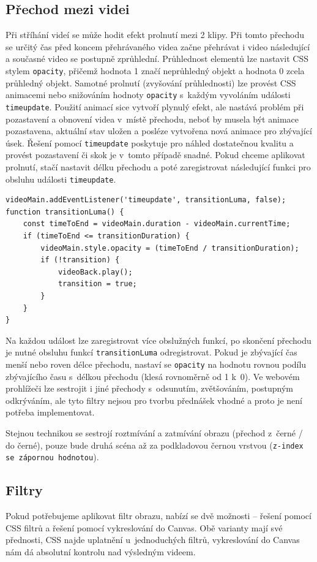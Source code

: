 \subsection{Přechod mezi videi}
Při stříhání videí se může hodit efekt prolnutí mezi 2 klipy. Při tomto přechodu se určitý čas před koncem přehrávaného videa začne přehrávat i video následující a současné video se postupně zprůhlední. Průhlednost elementů lze nastavit CSS stylem \texttt{opacity}, přičemž hodnota 1 značí neprůhledný objekt a hodnota 0 zcela průhledný objekt. Samotné prolnutí (zvyšování průhlednosti) lze provést CSS animacemi nebo snižováním hodnoty \texttt{opacity} s~každým vyvoláním události \texttt{timeupdate}. Použití animací sice vytvoří plynulý efekt, ale nastává problém při pozastavení a obnovení videa v~místě přechodu, neboť by musela být animace pozastavena, aktuální stav uložen a posléze vytvořena nová animace pro zbývající úsek. Řešení pomocí \texttt{timeupdate} poskytuje pro náhled dostatečnou kvalitu a provést pozastavení či skok je v~tomto případě snadné. Pokud chceme aplikovat prolnutí, stačí nastavit délku přechodu a poté zaregistrovat následující funkci pro obsluhu události \texttt{timeupdate}.
\begin{lstlisting}[style=JavaScript]
videoMain.addEventListener('timeupdate', transitionLuma, false);
function transitionLuma() {
    const timeToEnd = videoMain.duration - videoMain.currentTime;
    if (timeToEnd <= transitionDuration) {
        videoMain.style.opacity = (timeToEnd / transitionDuration);
        if (!transition) {
            videoBack.play();
            transition = true;
        }
    }
}
\end{lstlisting}
Na každou událost lze zaregistrovat více obslužných funkcí, po skončení přechodu je nutné obsluhu funkcí \texttt{transitionLuma} odregistrovat. Pokud je zbývající čas menší nebo roven délce přechodu, nastaví se \texttt{opacity} na hodnotu rovnou podílu zbývajícího času s~délkou přechodu (klesá rovnoměrně od 1 k~0). Ve webovém prohlížeči lze sestrojit i jiné přechody s~odsunutím, zvětšováním, postupným odkrýváním, ale tyto filtry nejsou pro tvorbu přednášek vhodné a proto je není potřeba implementovat.

Stejnou technikou se sestrojí roztmívání a zatmívání obrazu (přechod z~černé / do černé), pouze bude druhá scéna až za podkladovou černou vrstvou (\texttt{z-index se zápornou hodnotou}).

\subsection{Filtry}
Pokud potřebujeme aplikovat filtr obrazu, nabízí se dvě možnosti -- řešení pomocí CSS filtrů a řešení pomocí vykreslování do Canvas. Obě varianty mají své přednosti, CSS najde uplatnění u~jednoduchých filtrů, vykreslování do Canvas nám dá absolutní kontrolu nad výsledným videem.

